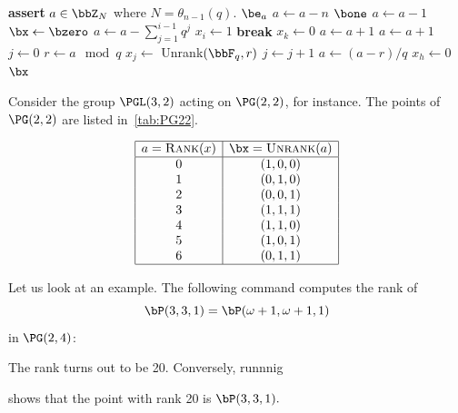 \begin{algorithm}
\caption{Unrank}\label{algo:Unrank}
\begin{algorithmic}[1]
\State \textbf{assert} $a \in \bbZ_N$ where $N = \theta_{n-1}(q).$
\State \Return $\be_a$
\EndIf
\State $a \gets a - n$
\State \Return $\bone$
\EndIf
\State $a \gets a - 1$
\State $\bx \gets \bzero$
\State $a \gets a - \sum_{j=1}^{i-1}q^j$
\Else
\State $x_i \gets 1$
\State \textbf{break}
\EndIf
\EndFor
{}
\State $x_k \gets 0$
\EndFor
\State $a \gets a + 1$
\State $ a \gets a + 1$
\EndIf
\State $j \gets 0$
\State $r \gets a \mod q$
\State $x_j \gets $ {\sc Unrank}$(\bbF_q,r)$
\State $j \gets j + 1$
\State $a \gets (a - r)/q$
\EndWhile
{}
\State $x_h \gets 0$
\EndFor
\State \Return $\bx$
\EndProcedure
\end{algorithmic}
\end{algorithm}
Consider the group $\PGL(3,2)$ acting on $\PG(2,2)$, 
for instance. 
The points of $\PG(2,2)$ are listed in~\ref{tab:PG22}.
\begin{table}
$$
\begin{array}{|c|c|}
\hline
a = \mbox{{\sc Rank}}(x) & \bx = \mbox{{\sc Unrank}}(a) \\
\hline
0 & (1,0,0)\\
1 & (0,1,0)\\
2 & (0,0,1)\\
3 & (1,1,1) \\
4 & (1,1,0)\\
5 & (1,0,1)\\
6 & (0,1,1)\\
\hline
\end{array}
$$
\caption{\label{tab:PG22}Representatives of 
the points of $\PG(2,2)$}
\end{table}


\bigskip

Let us look at an example.
The following command computes the rank of 
$$
\bP(3,3,1) = \bP(\omega+1,\omega+1,1)
$$
in $\PG(2,4)$:
{\tt

}
The rank turns out to be 20.
Conversely, runnnig 
{\tt

}
shows that the point with rank 20 is $\bP(3,3,1).$



